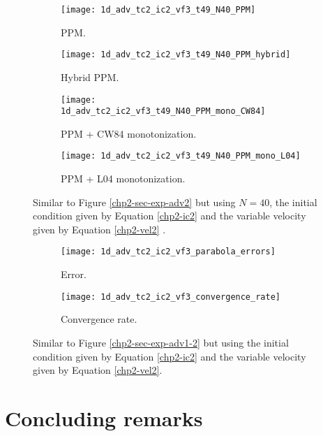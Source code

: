 \begin{figure}[!htb]
  \centering
  \begin{subfigure}{0.49\textwidth}
    \centering
			\texttt{[image: 1d\_adv\_tc2\_ic2\_vf3\_t49\_N40\_PPM]}
			\caption{PPM.\label{chp2-sec-exp-adv6-a}}
  \end{subfigure}
  \begin{subfigure}{0.49\textwidth}
    \centering
			\texttt{[image: 1d\_adv\_tc2\_ic2\_vf3\_t49\_N40\_PPM\_hybrid]}
			\caption{Hybrid PPM.\label{chp2-sec-exp-adv6-b}}
  \end{subfigure}

  \begin{subfigure}{0.49\textwidth}
    \centering
		\texttt{[image: 1d\_adv\_tc2\_ic2\_vf3\_t49\_N40\_PPM\_mono\_CW84]}
    \caption{PPM + CW84 monotonization.\label{chp2-sec-exp-adv6-c}}
  \end{subfigure}
  \begin{subfigure}{0.49\textwidth}
    \centering
			\texttt{[image: 1d\_adv\_tc2\_ic2\_vf3\_t49\_N40\_PPM\_mono\_L04]}
      \caption{PPM + L04 monotonization.\label{chp2-sec-exp-adv6-d}}
  \end{subfigure} 
	\caption{ Similar to Figure \ref{chp2-sec-exp-adv2} but using $N=40$, 
	the initial condition given by Equation \eqref{chp2-ic2} and the variable velocity given by Equation
	\eqref{chp2-vel2} \label{chp2-sec-exp-adv6}.}
\end{figure}

\begin{figure}[!htb]
  \centering
  \begin{subfigure}{0.49\textwidth}
    \centering
		\texttt{[image: 1d\_adv\_tc2\_ic2\_vf3\_parabola\_errors]}
		\caption{Error.\label{chp2-sec-exp-adv6-error}}
  \end{subfigure}
  \begin{subfigure}{0.49\textwidth}
    \centering
			\texttt{[image: 1d\_adv\_tc2\_ic2\_vf3\_convergence\_rate]}
		\caption{Convergence rate.\label{chp2-sec-exp-adv6-CR}}
  \end{subfigure}
	\caption{ Similar to Figure \ref{chp2-sec-exp-adv1-2} but using
	the initial condition given by Equation	\eqref{chp2-ic2} and the variable 
	velocity given by Equation \eqref{chp2-vel2}.\label{chp2-sec-exp-adv6-2}}
\end{figure}

\newpage
\section{Concluding remarks}
\label{chp2-sec-conclusion}
